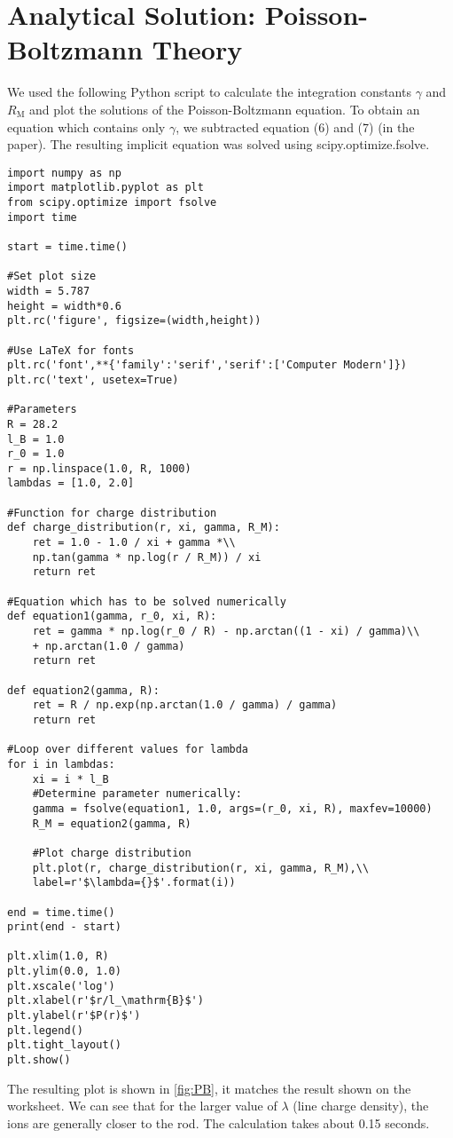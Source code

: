 \documentclass[a4paper,10pt,bibtotoc]{scrartcl}
\begin{document}
\section{Analytical Solution: Poisson-Boltzmann Theory}
We used the following Python script to calculate the integration constants $\gamma$ and $R_\mathrm{M}$ and plot the solutions of the Poisson-Boltzmann equation. To obtain an equation which contains only $\gamma$, we subtracted equation (6) and (7) (in the paper). The resulting implicit equation was solved using scipy.optimize.fsolve.
\begin{lstlisting}
import numpy as np
import matplotlib.pyplot as plt
from scipy.optimize import fsolve
import time

start = time.time()

#Set plot size
width = 5.787
height = width*0.6
plt.rc('figure', figsize=(width,height))

#Use LaTeX for fonts
plt.rc('font',**{'family':'serif','serif':['Computer Modern']})
plt.rc('text', usetex=True)

#Parameters
R = 28.2
l_B = 1.0
r_0 = 1.0
r = np.linspace(1.0, R, 1000)
lambdas = [1.0, 2.0]

#Function for charge distribution
def charge_distribution(r, xi, gamma, R_M):
    ret = 1.0 - 1.0 / xi + gamma *\\
    np.tan(gamma * np.log(r / R_M)) / xi
    return ret

#Equation which has to be solved numerically
def equation1(gamma, r_0, xi, R):
    ret = gamma * np.log(r_0 / R) - np.arctan((1 - xi) / gamma)\\
    + np.arctan(1.0 / gamma)
    return ret

def equation2(gamma, R):
    ret = R / np.exp(np.arctan(1.0 / gamma) / gamma)
    return ret

#Loop over different values for lambda
for i in lambdas:
    xi = i * l_B
    #Determine parameter numerically:
    gamma = fsolve(equation1, 1.0, args=(r_0, xi, R), maxfev=10000)
    R_M = equation2(gamma, R)
    
    #Plot charge distribution
    plt.plot(r, charge_distribution(r, xi, gamma, R_M),\\
    label=r'$\lambda={}$'.format(i))
    
end = time.time()
print(end - start)

plt.xlim(1.0, R)
plt.ylim(0.0, 1.0)
plt.xscale('log')
plt.xlabel(r'$r/l_\mathrm{B}$')
plt.ylabel(r'$P(r)$')
plt.legend()
plt.tight_layout()
plt.show()
\end{lstlisting}
The resulting plot is shown in \autoref{fig:PB}, it matches the result shown on the worksheet. We can see that for the larger value of $\lambda$ (line charge density), the ions are generally closer to the rod. The calculation takes about 0.15 seconds.
\end{document}
